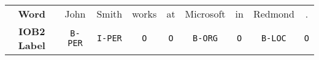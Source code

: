 \begin{tabular}{c|cccccccc}
    \bfseries Word & John & Smith & works & at & Microsoft & in & Redmond & . \\
    \bfseries IOB2 Label & \texttt{B-PER} & \texttt{I-PER} & \texttt{O} & \texttt{O} & \texttt{B-ORG} & \texttt{O} & \texttt{B-LOC} & \texttt{O} \\
\end{tabular}
